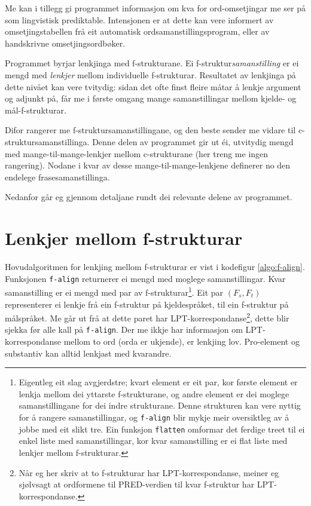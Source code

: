 \documentclass[11pt,a4paper,oneside,draft]{book}
\begin{document}
Me kan i tillegg gi programmet informasjon om kva for ord-omsetjingar
me ser på som lingvistisk prediktable. Intensjonen er at dette kan
vere informert av omsetjingstabellen frå eit automatisk
ordsamanstillingsprogram, eller av handskrivne omsetjingsordbøker.

Programmet byrjar lenkjinga med f-strukturane. Ei
f-struktur\emph{samanstilling} er ei mengd med \emph{lenkjer} mellom
individuelle f-strukturar. Resultatet av lenkjinga på dette nivået kan
vere tvitydig: sidan det ofte finst fleire måtar å lenkje argument og
adjunkt på, får me i første omgang mange samanstillingar mellom
kjelde- og mål-f-strukturar.

Difor rangerer me f-struktursamanstillingane, og den beste sender me
vidare til c-struktursamanstillinga. Denne delen av programmet gir ut
éi, utvitydig mengd med mange-til-mange-lenkjer mellom c-strukturane
(her treng me ingen rangering). Nodane i kvar av desse
mange-til-mange-lenkjene definerer no den endelege
frasesamanstillinga.

Nedanfor går eg gjennom detaljane rundt dei relevante delene av
programmet.

\section{Lenkjer mellom f-strukturar}
\label{sec-4.1}

\label{SEC:impl-f-lenkjing}

Hovudalgoritmen for lenkjing mellom f-strukturar er vist i kodefigur
\ref{algo:f-align}. Funksjonen \texttt{f-align} returnerer ei mengd med
moglege samanstillingar. Kvar samanstilling er ei mengd med par av
f-strukturar\footnote{Eigentleg eit slag avgjerdstre; kvart element er eit par, kor
        første element er lenkja mellom dei yttarste f-strukturane, og
        andre element er dei moglege samanstillingane for dei indre
        strukturane. Denne strukturen kan vere nyttig for å rangere
        samanstillingar, og \texttt{f-align} blir mykje meir oversiktleg av å
        jobbe med eit slikt tre. Ein funksjon \texttt{flatten} omformar det
        ferdige treet til ei enkel liste med samanstillingar, kor kvar
        samanstilling er ei flat liste med lenkjer mellom
        f-strukturar. }. Eit par $(F_s,F_t)$ representerer ei lenkje frå
ein f-struktur på kjeldespråket, til ein f-struktur på målspråket. Me
går ut frå at dette paret har LPT-korrespondanse\footnote{Når eg her skriv at to f-strukturar har LPT-korrespondanse,
        meiner eg sjølvsagt at ordformene til PRED-verdien til kvar
        f-struktur har LPT-korrespondanse. }, dette blir
sjekka før alle kall på \texttt{f-align}. Der me ikkje har informasjon om
LPT-korrespondanse mellom to ord (orda er ukjende), er lenkjing
lov. Pro-element og substantiv kan alltid lenkjast med kvarandre.
\end{document}

